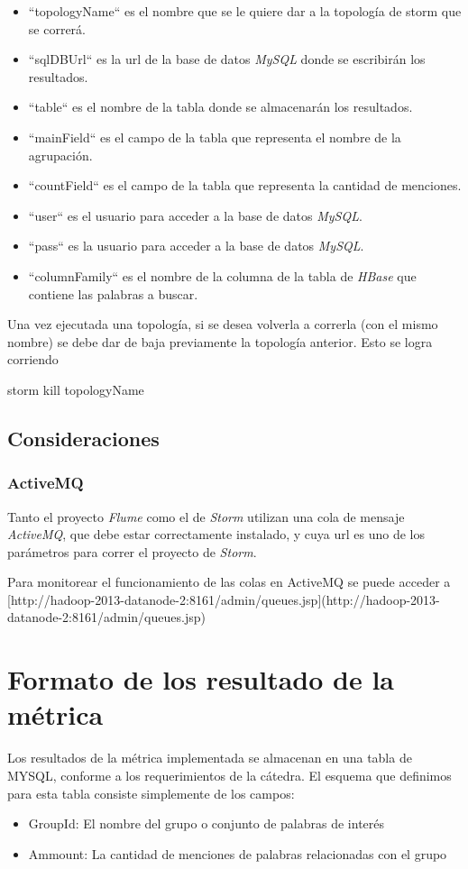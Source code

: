 \documentclass[a4paper,10pt]{article}
\begin{document}
\begin{itemize}
	\item ``topologyName`` es el nombre que se le quiere dar a la topología de storm que se correrá.
	\item ``sqlDBUrl`` es la url de la base de datos \textit{MySQL} donde se escribirán los resultados.
	\item ``table`` es el nombre de la tabla donde se almacenarán los resultados.
	\item ``mainField`` es el campo de la tabla que representa el nombre de la agrupación.
	\item ``countField`` es el campo de la tabla que representa la cantidad de menciones.
	\item ``user`` es el usuario para acceder a la base de datos \textit{MySQL}.
	\item ``pass`` es la usuario para acceder a la base de datos \textit{MySQL}.
	\item ``columnFamily`` es el nombre de la columna de la tabla de \textit{HBase} que contiene las palabras a buscar.
\end{itemize}

Una vez ejecutada una topología, si se desea volverla a correrla (con el mismo nombre) se debe dar de baja previamente la topología anterior. Esto se logra corriendo

	storm kill topologyName

\subsection{Consideraciones}

\subsubsection{ActiveMQ}

Tanto el proyecto \textit{Flume} como el de \textit{Storm} utilizan una cola de mensaje \textit{ActiveMQ}, que debe estar correctamente instalado, 
y cuya url es uno de los parámetros para correr el proyecto de \textit{Storm}.

Para monitorear el funcionamiento de las colas en ActiveMQ se puede acceder a 
[http://hadoop-2013-datanode-2:8161/admin/queues.jsp](http://hadoop-2013-datanode-2:8161/admin/queues.jsp)
	
\small
\section{Formato de los resultado de la métrica}

Los resultados de la métrica implementada se almacenan en una tabla de MYSQL, conforme a los requerimientos de la cátedra. El esquema que definimos para esta tabla consiste
simplemente de los campos:

\begin{itemize}
    \item GroupId: El nombre del grupo o conjunto de palabras de interés
    \item Ammount: La cantidad de menciones de palabras relacionadas con el grupo
\end{itemize}
\end{document}
